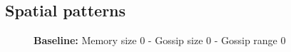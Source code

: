 \documentclass[english]{article}
\begin{document}
\subsection{Spatial patterns}

\begin{figure}[!h]
  \centering
  \textbf{Baseline:} Memory size 0 - Gossip size 0 - Gossip range 0
\end{figure}
\end{document}
